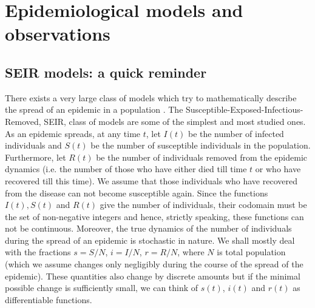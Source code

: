 \documentclass[aps,prd,10pt,twocolumn,nofootinbib]{revtex4-2}
\begin{document}
\section{Epidemiological models and observations}

\subsection{SEIR models: a quick reminder}
\label{sec:reminder}
%
%
There exists a very large class of models which try to mathematically describe the spread of an epidemic in a population \cite{Book_2008,Book_2018}. The Susceptible-Exposed-Infectious-Removed, SEIR, class of models are some of the simplest and most studied ones.
As an epidemic spreads, at any time $t$, let $I(t)$ be the number of infected individuals and $S(t)$ be the number of susceptible individuals in the population. Furthermore, let $R(t)$ be the number of individuals removed from the epidemic dynamics (i.e. the number of those who have either died till time $t$ or who have recovered till this time). We assume that those individuals who have recovered from the disease can not become susceptible again.
Since the functions $I(t), S(t)$ and $R(t)$ give the number of individuals, their codomain must be the set of non-negative integers and hence, strictly speaking, these functions can not be continuous.
Moreover, the true dynamics of the number of individuals during the spread of an epidemic is stochastic in nature.
We shall mostly deal with the fractions $s = S/N$, $i=I/N$, $r = R/N$, where $N$ is total population (which we assume changes only negligibly during the course of the spread of the epidemic). These quantities also change by discrete amounts but if the minimal possible change is sufficiently small, we can think of $s(t)$, $i(t)$ and $r(t)$ as differentiable functions.

\end{document}
